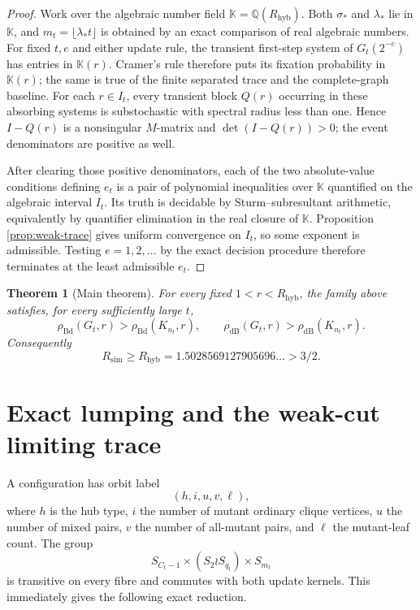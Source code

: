 \documentclass[11pt]{article}
\newtheorem{theorem}{Theorem}
\theoremstyle{definition}
\theoremstyle{remark}
\newcommand{\Bd}{\mathrm{Bd}}
\newcommand{\dB}{\mathrm{dB}}
\newcommand{\Rsim}{R_{\mathrm{sim}}}
\newcommand{\Rhyb}{R_{\mathrm{hyb}}}
\begin{document}
\begin{proof}
Work over the algebraic number field $\mathbb K=\mathbb Q(\Rhyb)$.
Both $\sigma_*$ and $\lambda_*$ lie in $\mathbb K$, and
$m_t=\lfloor\lambda_*t\rfloor$ is obtained by an exact comparison of real
algebraic numbers.  For fixed $t,e$ and either update rule, the transient
first-step system of $G_t(2^{-e})$ has entries in $\mathbb K(r)$.  Cramer's
rule therefore puts its fixation probability in $\mathbb K(r)$; the same is
true of the finite separated trace and the complete-graph baseline.  For
each $r\in I_t$, every transient block $Q(r)$ occurring in these absorbing
systems is substochastic with spectral radius less than one.  Hence
$I-Q(r)$ is a nonsingular $M$-matrix and
$\det(I-Q(r))>0$; the event denominators are positive as well.

After clearing those positive denominators, each of the two absolute-value
conditions defining $e_t$ is a pair of polynomial inequalities over
$\mathbb K$ quantified on the algebraic interval $I_t$.  Its truth is
decidable by Sturm--subresultant arithmetic, equivalently by quantifier
elimination in the real closure of $\mathbb K$.  Proposition
\ref{prop:weak-trace} gives uniform convergence on $I_t$, so some exponent is
admissible.  Testing $e=1,2,\ldots$ by the exact decision procedure therefore
terminates at the least admissible $e_t$.
\end{proof}

\begin{theorem}[Main theorem]
\label{thm:main}
For every fixed $1<r<\Rhyb$, the family above satisfies, for every
sufficiently large $t$,
\[
 \rho_{\Bd}(G_t,r)>\rho_{\Bd}(K_{n_t},r),\qquad
 \rho_{\dB}(G_t,r)>\rho_{\dB}(K_{n_t},r).
\]
Consequently
\[
 \boxed{\Rsim\geq\Rhyb=1.5028569127905696\ldots>3/2.}
\]
\end{theorem}

\section{Exact lumping and the weak-cut limiting trace}
\label{sec:trace}

A configuration has orbit label
\[
 (h,i,u,v,\ell),
\]
where $h$ is the hub type, $i$ the number of mutant ordinary clique
vertices, $u$ the number of mixed pairs, $v$ the number of all-mutant pairs,
and $\ell$ the mutant-leaf count.  The group
\[
S_{C_t-1}\times(S_2\wr S_{q_t})\times S_{m_t}
\]
is transitive on every fibre and commutes with both update kernels.  This
immediately gives the following exact reduction.
\end{document}
